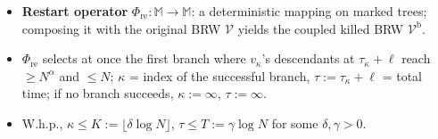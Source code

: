 \centering
\resizebox{0.80\textwidth}{!}{}

\vspace{4pt}
\begin{itemize}
    \item \textbf{Restart operator} $\Phi_{\mathrm{re}}:\mathbb M\to\mathbb M$:
    a deterministic mapping on marked trees; composing it with the original BRW $\mathcal V$ yields
    the coupled killed BRW $\mathcal V^{\mathrm b}$.
    \item $\Phi_{\mathrm{re}}$ selects at once the first branch where
    $v_\kappa$'s descendants at $\tau_\kappa+\ell$ reach
    $\ge N^\alpha$ and $\le N$;
    $\kappa$ = index of the successful branch, $\tau:=\tau_\kappa+\ell$ = total time;
    if no branch succeeds, $\kappa:=\infty$, $\tau:=\infty$.
    \item W.h.p., $\kappa\le K:=\lfloor\delta\log N\rfloor$,
    $\tau\le T:=\gamma\log N$ for some $\delta,\gamma>0$.
\end{itemize}
